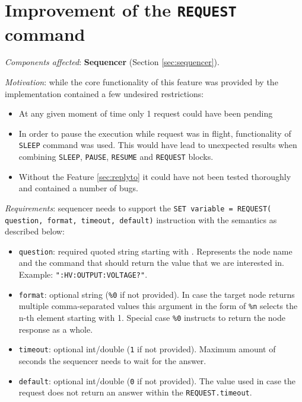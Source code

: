 \section{Improvement of the \texttt{REQUEST} command}
\label{sec:request}

\textit{Components affected}: \textbf{Sequencer} (Section \ref{sec:sequencer}).

\textit{Motivation}: while the core functionality of this feature was provided by \cite{Germann2019} the implementation contained a few undesired restrictions:

\begin{itemize}
	\item At any given moment of time only 1 request could have been pending
	\item In order to pause the execution while request was in flight, functionality of \texttt{SLEEP} command was used. This would have lead to unexpected results when combining \texttt{SLEEP}, \texttt{PAUSE}, \texttt{RESUME} and \texttt{REQUEST} blocks.
	\item Without the Feature \ref{sec:replyto} it could have not been tested thoroughly and contained a number of bugs.
\end{itemize}

\textit{Requirements}: sequencer needs to support the \texttt{SET variable = REQUEST( question, format, timeout, default)} instruction with the semantics as described below:

\begin{itemize}
	\item \texttt{question}: required quoted string starting with \highlight{:}. Represents the node name and the  command that should return the value that we are interested in. Example: \texttt{":HV:OUTPUT:VOLTAGE?"}.
	\item \texttt{format}: optional string (\texttt{\%0} if not provided). In case the target node returns multiple comma-separated values this argument in the form of \texttt{\%n} selects the n-th element starting with 1. Special case \texttt{\%0} instructs to return the node response as a whole.
	\item \texttt{timeout}: optional int/double (\texttt{1} if not provided). Maximum amount of seconds the sequencer needs to wait for the answer.
	\item \texttt{default}: optional int/double (\texttt{0} if not provided). The value used in case the request does not return an answer within the \texttt{REQUEST.timeout}.
\end{itemize}

